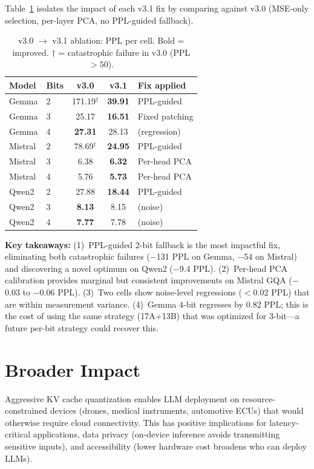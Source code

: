 \documentclass[10pt,twocolumn]{article}
\begin{document}
Table~\ref{tab:v3_ablation} isolates the impact of each v3.1 fix by
comparing against v3.0 (MSE-only selection, per-layer PCA, no
PPL-guided fallback).

\begin{table}[t]
\centering
\small
\caption{v3.0 $\to$ v3.1 ablation: PPL per cell. Bold = improved.
$\dagger$ = catastrophic failure in v3.0 (PPL $> 50$).}
\label{tab:v3_ablation}
\setlength{\tabcolsep}{4pt}
\begin{tabular}{ll|cc|l}
\toprule
Model & Bits & v3.0 & \textbf{v3.1} & Fix applied \\
\midrule
Gemma   & 2 & 171.19$^\dagger$ & \textbf{39.91} & PPL-guided \\
Gemma   & 3 & 25.17 & \textbf{16.51} & Fixed patching \\
Gemma   & 4 & \textbf{27.31} & 28.13 & (regression) \\
\midrule
Mistral & 2 & 78.69$^\dagger$ & \textbf{24.95} & PPL-guided \\
Mistral & 3 & 6.38 & \textbf{6.32} & Per-head PCA \\
Mistral & 4 & 5.76 & \textbf{5.73} & Per-head PCA \\
\midrule
Qwen2   & 2 & 27.88 & \textbf{18.44} & PPL-guided \\
Qwen2   & 3 & \textbf{8.13} & 8.15 & (noise) \\
Qwen2   & 4 & \textbf{7.77} & 7.78 & (noise) \\
\bottomrule
\end{tabular}
\end{table}

\textbf{Key takeaways:} (1)~PPL-guided 2-bit fallback is the most
impactful fix, eliminating both catastrophic failures ($-$131 PPL on
Gemma, $-$54 on Mistral) and discovering a novel optimum on Qwen2
($-$9.4 PPL). (2)~Per-head PCA calibration provides marginal but
consistent improvements on Mistral GQA ($-$0.03 to $-$0.06 PPL).
(3)~Two cells show noise-level regressions ($<$0.02 PPL) that are
within measurement variance. (4)~Gemma 4-bit regresses by 0.82 PPL;
this is the cost of using the same strategy (17A+13B) that was
optimized for 3-bit---a future per-bit strategy could recover this.

\section{Broader Impact}

Aggressive KV cache quantization enables LLM deployment on
resource-constrained devices (drones, medical instruments, automotive
ECUs) that would otherwise require cloud connectivity. This has positive
implications for latency-critical applications, data privacy (on-device
inference avoids transmitting sensitive inputs), and accessibility
(lower hardware cost broadens who can deploy LLMs).
\end{document}
